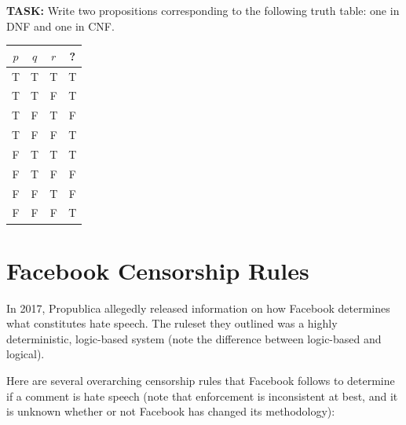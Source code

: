 \documentclass[12pt,letterpaper]{article}
\begin{document}
    \begin{mdframed} \vspace{2.5cm} \end{mdframed}
	
	\textbf{TASK:} Write two propositions corresponding to the following truth table: one in DNF and one in CNF.
	
	\begin{tabular}{c|c|c|c}
         $p$ & $q$ & $r$ & ?\\
        \hline
        T & T & T & T \\
        T & T & F & T \\
        T & F & T & F \\
        T & F & F & T \\
        F & T & T & T \\
        F & T & F & F \\
        F & F & T & F \\
        F & F & F & T
    \end{tabular}
	
    \begin{mdframed} \vspace{2.5cm} \end{mdframed}
	
\newpage 
 \section*{Facebook Censorship Rules}
  
  In 2017, Propublica allegedly released information on how Facebook determines what constitutes hate speech. The ruleset they outlined was a highly deterministic, logic-based system (note the difference between logic-based and logical). 
  
  Here are several overarching censorship rules that Facebook follows to determine if a comment is hate speech (note that enforcement is inconsistent at best, and it is unknown whether or not Facebook has changed its methodology): 
  
\end{document}
